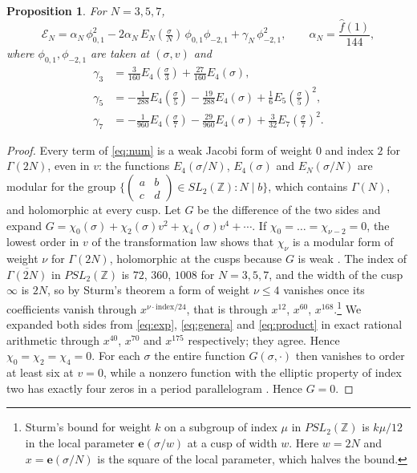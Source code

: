 \documentclass[11pt]{amsart}
\numberwithin{equation}{section}
\theoremstyle{plain}
\newtheorem{prop}[thm]{Proposition}
\theoremstyle{remark}
\newcommand{\Z}{\mathbb{Z}}
\newcommand{\cE}{\mathcal{E}}
\newcommand{\e}{\mathbf{e}}
\newcommand{\pmi}{\phi_{-2,1}}
\newcommand{\pz}{\phi_{0,1}}
\begin{document}
\begin{prop}\label{prop:num}
For $N=3,5,7$,
\begin{equation}\label{eq:num}
\cE_N=\alpha_N\,\pz^2-2\alpha_N\,E_N(\tfrac\sigma N)\,\pz\pmi+\gamma_N\,\pmi^2,\qquad \alpha_N=\frac{\hat f(1)}{144},
\end{equation}
where $\pz,\pmi$ are taken at $(\sigma,v)$ and
\begin{align*}
\gamma_3&=\tfrac{3}{160}E_4(\tfrac\sigma3)+\tfrac{27}{160}E_4(\sigma),\\
\gamma_5&=-\tfrac{1}{288}E_4(\tfrac\sigma5)-\tfrac{19}{288}E_4(\sigma)+\tfrac16E_5(\tfrac\sigma5)^2,\\
\gamma_7&=-\tfrac{1}{960}E_4(\tfrac\sigma7)-\tfrac{29}{960}E_4(\sigma)+\tfrac{3}{32}E_7(\tfrac\sigma7)^2.
\end{align*}
\end{prop}

\begin{proof}
Every term of \eqref{eq:num} is a weak Jacobi form of weight $0$ and index $2$ for $\Gamma(2N)$, even in $v$: the functions $E_4(\sigma/N)$, $E_4(\sigma)$ and $E_N(\sigma/N)$ are modular for the group $\{\left(\begin{smallmatrix}a&b\\c&d\end{smallmatrix}\right)\in SL_2(\Z):N\mid b\}$, which contains $\Gamma(N)$, and holomorphic at every cusp. Let $G$ be the difference of the two sides and expand $G=\chi_0(\sigma)+\chi_2(\sigma)v^2+\chi_4(\sigma)v^4+\cdots$. If $\chi_0=\dots=\chi_{\nu-2}=0$, the lowest order in $v$ of the transformation law shows that $\chi_\nu$ is a modular form of weight $\nu$ for $\Gamma(2N)$, holomorphic at the cusps because $G$ is weak \cite[\S3]{EZ85}. The index of $\overline{\Gamma(2N)}$ in $PSL_2(\Z)$ is $72$, $360$, $1008$ for $N=3,5,7$, and the width of the cusp $\infty$ is $2N$, so by Sturm's theorem \cite{Stu87} a form of weight $\nu\le4$ vanishes once its coefficients vanish through $x^{\nu\cdot\mathrm{index}/24}$, that is through $x^{12}$, $x^{60}$, $x^{168}$.\footnote{Sturm's bound for weight $k$ on a subgroup of index $\mu$ in $PSL_2(\Z)$ is $k\mu/12$ in the local parameter $\e(\sigma/w)$ at a cusp of width $w$. Here $w=2N$ and $x=\e(\sigma/N)$ is the square of the local parameter, which halves the bound.} We expanded both sides from \eqref{eq:exp}, \eqref{eq:genera} and \eqref{eq:product} in exact rational arithmetic through $x^{40}$, $x^{70}$ and $x^{175}$ respectively; they agree. Hence $\chi_0=\chi_2=\chi_4=0$. For each $\sigma$ the entire function $G(\sigma,\cdot)$ then vanishes to order at least six at $v=0$, while a nonzero function with the elliptic property of index two has exactly four zeros in a period parallelogram \cite[Theorem~1.2]{EZ85}. Hence $G=0$.
\end{proof}
\end{document}
